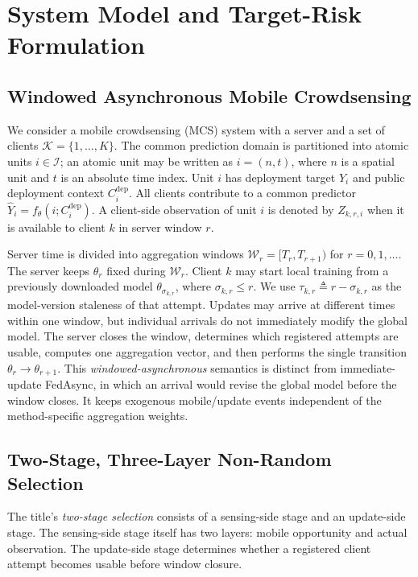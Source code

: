\documentclass[letterpaper,journal]{IEEEtran}
\begin{document}
\section{System Model and Target-Risk Formulation}
\label{sec:system_model}

\subsection{Windowed Asynchronous Mobile Crowdsensing}
\label{subsec:windowed_mcs}

We consider a mobile crowdsensing (MCS) system with a server and a set of
clients $\mathcal{K}=\{1,\ldots,K\}$.  The common prediction domain is
partitioned into atomic units $i\in\mathcal{I}$; an atomic unit may be written as
$i=(n,t)$, where $n$ is a spatial unit and $t$ is an absolute time index.  Unit
$i$ has deployment target $Y_i$ and public deployment context
$C_i^{\mathrm{dep}}$.  All clients contribute to a common predictor
$\widehat Y_i=f_{\theta}(i;C_i^{\mathrm{dep}})$.
A client-side observation of unit $i$ is denoted by $Z_{k,r,i}$ when it is
available to client $k$ in server window $r$.

Server time is divided into aggregation windows
$\mathcal{W}_r=[T_r,T_{r+1})$ for $r=0,1,\ldots$.
The server keeps $\theta_r$ fixed during $\mathcal{W}_r$.  Client $k$ may start
local training from a previously downloaded model $\theta_{\sigma_{k,r}}$,
where $\sigma_{k,r}\le r$.  We use
$\tau_{k,r}\triangleq r-\sigma_{k,r}$
as the model-version staleness of that attempt.  Updates may arrive at
different times within one window, but individual arrivals do not
immediately modify the global model.  The server closes the window,
determines which registered attempts are usable, computes one
aggregation vector, and then performs the single transition
$\theta_r\rightarrow\theta_{r+1}$.  This \emph{windowed-asynchronous}
semantics is distinct from immediate-update FedAsync, in which an
arrival would revise the global model before the window closes.  It
keeps exogenous mobile/update events independent of the method-specific
aggregation weights.

\subsection{Two-Stage, Three-Layer Non-Random Selection}
\label{subsec:selection_process}

The title's \emph{two-stage selection} consists of a sensing-side stage and an
update-side stage.  The sensing-side stage itself has two layers: mobile
opportunity and actual observation.  The update-side stage determines whether a
registered client attempt becomes usable before window closure.
\end{document}

